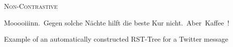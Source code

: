 {
\centering
\dirrel{}
        {}
        {\textsc{Non-Contrastive}}
        {
                {}
                {}
                {}}

\begin{flushleft}
\begin{rhetoricaltext}
\unit[1]{Mooooiiinn.}
\unit[2]{Gegen solche N\"achte hilft die beste Kur nicht.}
\unit[3]{Aber Kaffee!}
\end{rhetoricaltext}
\end{flushleft}
\caption[Automatic RST tree for a tweet]{Example of an automatically constructed RST-Tree for a Twitter message}\label{dasa:fig:twitter-rst-tree}
}

